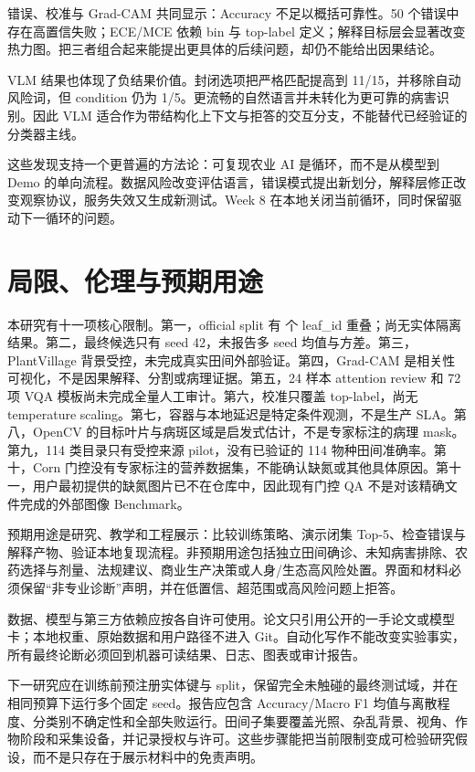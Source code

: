 \documentclass[UTF8,11pt]{ctexart}
\begin{document}
错误、校准与 Grad-CAM 共同显示：Accuracy 不足以概括可靠性。50 个错误中存在高置信失败；ECE/MCE 依赖 bin 与 top-label 定义；解释目标层会显著改变热力图。把三者组合起来能提出更具体的后续问题，却仍不能给出因果结论。

VLM 结果也体现了负结果价值。封闭选项把严格匹配提高到 11/15，并移除自动风险词，但 condition 仍为 1/5。更流畅的自然语言并未转化为更可靠的病害识别。因此 VLM 适合作为带结构化上下文与拒答的交互分支，不能替代已经验证的分类器主线。

这些发现支持一个更普遍的方法论：可复现农业 AI 是循环，而不是从模型到 Demo 的单向流程。数据风险改变评估语言，错误模式提出新划分，解释层修正改变观察协议，服务失效又生成新测试。Week 8 在本地关闭当前循环，同时保留驱动下一循环的问题。

\section{局限、伦理与预期用途}

本研究有十一项核心限制。第一，official split 有 \PDAOfficialOverlap 个 leaf\_id 重叠；尚无实体隔离结果。第二，最终候选只有 seed 42，未报告多 seed 均值与方差。第三，PlantVillage 背景受控，未完成真实田间外部验证。第四，Grad-CAM 是相关性可视化，不是因果解释、分割或病理证据。第五，24 样本 attention review 和 72 项 VQA 模板尚未完成全量人工审计。第六，校准只覆盖 top-label，尚无 temperature scaling。第七，容器与本地延迟是特定条件观测，不是生产 SLA。第八，OpenCV 的目标叶片与病斑区域是启发式估计，不是专家标注的病理 mask。第九，114 类目录只有受控来源 pilot，没有已验证的 114 物种田间准确率。第十，Corn 门控没有专家标注的营养数据集，不能确认缺氮或其他具体原因。第十一，用户最初提供的缺氮图片已不在仓库中，因此现有门控 QA 不是对该精确文件完成的外部图像 Benchmark。

预期用途是研究、教学和工程展示：比较训练策略、演示闭集 Top-5、检查错误与解释产物、验证本地复现流程。非预期用途包括独立田间确诊、未知病害排除、农药选择与剂量、法规建议、商业生产决策或人身/生态高风险处置。界面和材料必须保留“非专业诊断”声明，并在低置信、超范围或高风险问题上拒答。

数据、模型与第三方依赖应按各自许可使用。论文只引用公开的一手论文或模型卡；本地权重、原始数据和用户路径不进入 Git。自动化写作不能改变实验事实，所有最终论断必须回到机器可读结果、日志、图表或审计报告。

下一研究应在训练前预注册实体键与 split，保留完全未触碰的最终测试域，并在相同预算下运行多个固定 seed。报告应包含 Accuracy/Macro F1 均值与离散程度、分类别不确定性和全部失败运行。田间子集要覆盖光照、杂乱背景、视角、作物阶段和采集设备，并记录授权与许可。这些步骤能把当前限制变成可检验研究假设，而不是只存在于展示材料中的免责声明。
\end{document}

